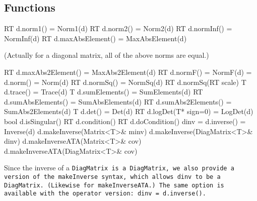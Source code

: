 \subsection{Functions}
\label{DiagMatrix_Functions}

\begin{tmvcode}
RT d.norm1() = Norm1(d)
RT d.norm2() = Norm2(d) 
RT d.normInf() = NormInf(d)
RT d.maxAbsElement() = MaxAbsElement(d)
\end{tmvcode}
(Actually for a diagonal matrix, all of the above norms are equal.)
\begin{tmvcode}
RT d.maxAbs2Element() = MaxAbs2Element(d)
RT d.normF() = NormF(d) = d.norm() = Norm(d)
RT d.normSq() = NormSq(d)
RT d.normSq(RT scale)
T d.trace() = Trace(d)
T d.sumElements() = SumElements(d)
RT d.sumAbsElements() = SumAbsElements(d)
RT d.sumAbs2Elements() = SumAbs2Elements(d)
T d.det() = Det(d)
RT d.logDet(T* sign=0) = LogDet(d)
bool d.isSingular()
RT d.condition()
RT d.doCondition()
dinv = d.inverse() = Inverse(d)
d.makeInverse(Matrix<T>& minv)
d.makeInverse(DiagMatrix<T>& dinv)
d.makeInverseATA(Matrix<T>& cov)
d.makeInverseATA(DiagMatrix<T>& cov)
\end{tmvcode}
Since the inverse of a \tt{DiagMatrix} is a \tt{DiagMatrix},
we also provide a version of the \tt{makeInverse} syntax, which allows dinv
to be a \tt{DiagMatrix}.  (Likewise for \tt{makeInverseATA}.)  The same option is 
available with the operator version: \tt{dinv = d.inverse()}.

